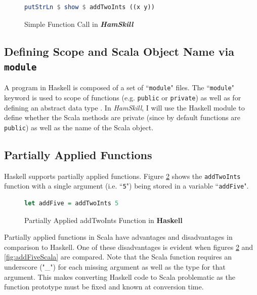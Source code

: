 \documentclass{report}
\begin{document}
\begin{figure}[H]
\begin{mdframed}
\begin{lstlisting}[language=Haskell]
putStrLn $ show $ addTwoInts ((x y))
\end{lstlisting}
\end{mdframed}
\caption{Simple Function Call in \textbf{\emph{HamSkill}}}\label{fig:addTwoNumbersHamSkill}
\end{figure}

\subsection{Defining Scope and Scala Object Name via {\tt module}}

A program in Haskell is composed of a set of ``{\tt module}" files.  The ``{\tt module}" keyword is used to  scope of functions (e.g. {\tt public} or {\tt private}) as well as for defining an abstract data type \cite{haskellModule}.  In \emph{HamSkill}, I will use the Haskell module to define whether the Scala methods are private (since by default functions are {\tt public}) as well as the name of the Scala object.

\subsection{Partially Applied Functions}\label{sec:partiallyAppliedFunctions}

Haskell supports partially applied functions.  Figure \ref{fig:addFiveHaskell} shows the {\tt addTwoInts} function with a single argument (i.e. ``{\tt 5}") being stored in a variable ``{\tt addFive}".  

\begin{figure}[H]
\begin{mdframed}
\begin{lstlisting}[language=Haskell]
let addFive = addTwoInts 5
\end{lstlisting}
\end{mdframed}
\caption{Partially Applied addTwoInts Function in \textbf{Haskell}}\label{fig:addFiveHaskell}
\end{figure}

Partially applied functions in Scala have advantages and disadvantages in comparison to Haskell.  One of these disadvantages is evident when figures \ref{fig:addFiveHaskell} and \ref{fig:addFiveScala} are compared.  Note that the Scala function requires an underscore ("\_") for each missing argument as well as the type for that argument.  This makes converting Haskell code to Scala problematic as the function prototype must be fixed and known at conversion time.  
\end{document}
